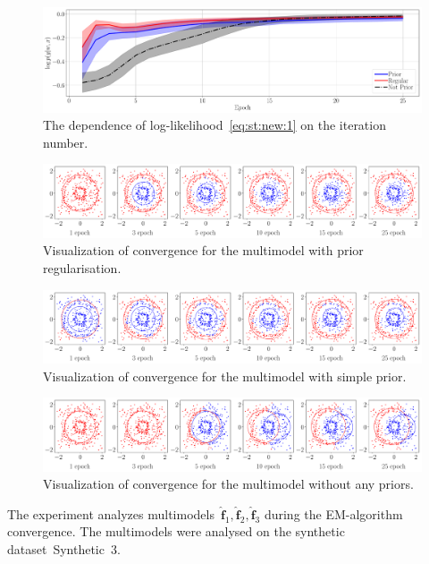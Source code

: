 \documentclass[12pt, twoside]{article}
\numberwithin{equation}{section}
\begin{document}
\begin{figure}[h!t]\center
\includegraphics[width=1\textwidth]{result_eng/experiment_synt_likelihood_progress}
\caption{The dependence of log-likelihood~\eqref{eq:st:new:1} on the iteration number.}
\label{experiment:st:2:2}
\end{figure}

\begin{figure}[h!t]\center
\includegraphics[width=1\textwidth]{result_eng/experiment_synt_regular_progress}
\caption{Visualization of convergence for the multimodel with prior regularisation.}
\label{experiment:st:2:3}
\end{figure}

\begin{figure}[h!t]\center
\includegraphics[width=1\textwidth]{result_eng/experiment_synt_prior_progress}
\caption{Visualization of convergence for the multimodel with simple prior.}
\label{experiment:st:2:4}
\end{figure}

\begin{figure}[h!t]\center
\includegraphics[width=1\textwidth]{result_eng/experiment_synt_not_prior_progress}
\caption{Visualization of convergence for the multimodel without any priors.}
\label{experiment:st:2:5}
\end{figure}
The experiment analyzes multimodels~$\hat{\mathbf{f}}_1, \hat{\mathbf{f}}_2, \hat{\mathbf{f}}_3$ during the EM-algorithm convergence.
The multimodels were analysed on the synthetic dataset~Synthetic~3.
\end{document}
